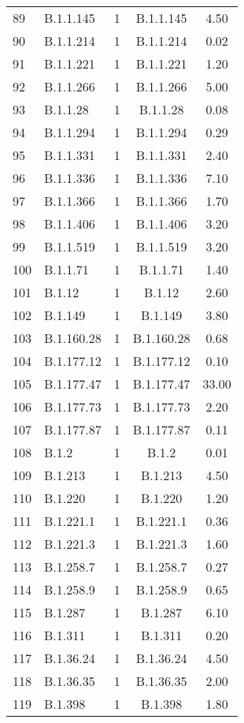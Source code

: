 \begin{longtable}{lp{4cm}ccc}
  89 & B.1.1.145 &   1 & B.1.1.145 & 4.50 \\ 
  90 & B.1.1.214 &   1 & B.1.1.214 & 0.02 \\ 
  91 & B.1.1.221 &   1 & B.1.1.221 & 1.20 \\ 
  92 & B.1.1.266 &   1 & B.1.1.266 & 5.00 \\ 
  93 & B.1.1.28 &   1 & B.1.1.28 & 0.08 \\ 
  94 & B.1.1.294 &   1 & B.1.1.294 & 0.29 \\ 
  95 & B.1.1.331 &   1 & B.1.1.331 & 2.40 \\ 
  96 & B.1.1.336 &   1 & B.1.1.336 & 7.10 \\ 
  97 & B.1.1.366 &   1 & B.1.1.366 & 1.70 \\ 
  98 & B.1.1.406 &   1 & B.1.1.406 & 3.20 \\ 
  99 & B.1.1.519 &   1 & B.1.1.519 & 3.20 \\ 
  100 & B.1.1.71 &   1 & B.1.1.71 & 1.40 \\ 
  101 & B.1.12 &   1 & B.1.12 & 2.60 \\ 
  102 & B.1.149 &   1 & B.1.149 & 3.80 \\ 
  103 & B.1.160.28 &   1 & B.1.160.28 & 0.68 \\ 
  104 & B.1.177.12 &   1 & B.1.177.12 & 0.10 \\ 
  105 & B.1.177.47 &   1 & B.1.177.47 & 33.00 \\ 
  106 & B.1.177.73 &   1 & B.1.177.73 & 2.20 \\ 
  107 & B.1.177.87 &   1 & B.1.177.87 & 0.11 \\ 
  108 & B.1.2 &   1 & B.1.2 & 0.01 \\ 
  109 & B.1.213 &   1 & B.1.213 & 4.50 \\ 
  110 & B.1.220 &   1 & B.1.220 & 1.20 \\ 
  111 & B.1.221.1 &   1 & B.1.221.1 & 0.36 \\ 
  112 & B.1.221.3 &   1 & B.1.221.3 & 1.60 \\ 
  113 & B.1.258.7 &   1 & B.1.258.7 & 0.27 \\ 
  114 & B.1.258.9 &   1 & B.1.258.9 & 0.65 \\ 
  115 & B.1.287 &   1 & B.1.287 & 6.10 \\ 
  116 & B.1.311 &   1 & B.1.311 & 0.20 \\ 
  117 & B.1.36.24 &   1 & B.1.36.24 & 4.50 \\ 
  118 & B.1.36.35 &   1 & B.1.36.35 & 2.00 \\ 
  119 & B.1.398 &   1 & B.1.398 & 1.80 \\ 

\end{longtable}
